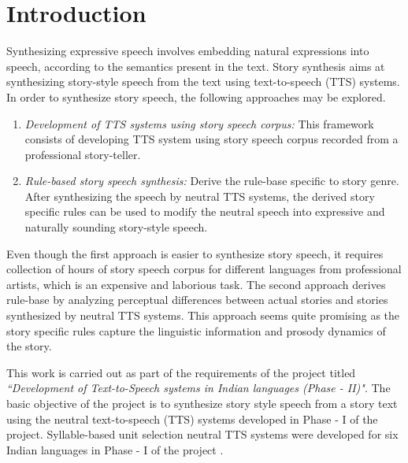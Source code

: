 \documentclass[times, 11pt, a4paper]{article}
\begin{document}

\thispagestyle{empty}
\newpage
\thispagestyle{empty}
\tableofcontents
\newpage
\setcounter{page}{1}

\section{Introduction} \label{Introduction}


Synthesizing expressive speech involves embedding natural expressions into speech, according to the semantics present in the text. Story synthesis aims at synthesizing story-style speech from the text using text-to-speech (TTS) systems. In order to synthesize story speech, the following approaches may be explored.

\begin{enumerate}
\item \textit{Development of TTS systems using story speech corpus:} This framework consists of developing  TTS system using story speech corpus recorded from a professional story-teller.
\item \textit{Rule-based story speech synthesis:} Derive the rule-base specific to story genre. After synthesizing the speech by neutral TTS systems, the derived story specific rules can be used to modify the neutral speech into expressive and naturally sounding story-style speech. 
\end{enumerate}

Even though the first approach is easier to synthesize story speech, it requires collection of hours of story speech corpus for different languages from professional artists, which is an expensive and laborious task. The second approach derives rule-base by analyzing perceptual differences between actual stories and stories synthesized by neutral TTS systems. This approach seems quite promising as the story specific rules capture the linguistic information and prosody dynamics of the story. 


This work is carried out as part of the requirements of the project titled \textit{``Development of Text-to-Speech systems in Indian languages (Phase - II)"}. The basic objective of the project is to synthesize story style speech from a story text using the neutral text-to-speech (TTS) systems developed in Phase - I of the project. Syllable-based unit selection neutral TTS systems were developed for six Indian languages in Phase - I of the project \cite{patil2013syllable}. 
\end{document}
